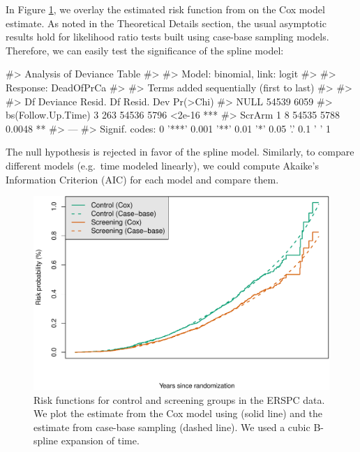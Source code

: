 In Figure \ref{fig:erspc-cox-cif}, we overlay the estimated risk
function from  on the Cox model estimate. As noted in the
Theoretical Details section, the usual asymptotic results hold for
likelihood ratio tests built using case-base sampling models. Therefore,
we can easily test the significance of the spline model:

\begin{Schunk}
\begin{Soutput}
#> Analysis of Deviance Table
#> 
#> Model: binomial, link: logit
#> 
#> Response: DeadOfPrCa
#> 
#> Terms added sequentially (first to last)
#> 
#> 
#>                    Df Deviance Resid. Df Resid. Dev Pr(>Chi)    
#> NULL                               54539       6059             
#> bs(Follow.Up.Time)  3      263     54536       5796   <2e-16 ***
#> ScrArm              1        8     54535       5788   0.0048 ** 
#> ---
#> Signif. codes:  0 '***' 0.001 '**' 0.01 '*' 0.05 '.' 0.1 ' ' 1
\end{Soutput}
\end{Schunk}

The null hypothesis is rejected in favor of the spline model. Similarly,
to compare different models (e.g.~time modeled linearly), we could
compute Akaike's Information Criterion (AIC) for each model and compare
them.

\begin{Schunk}
\begin{figure}[ht]
\includegraphics[width=\textwidth,keepaspectratio=true]{./erspc-cox-cif-1} \caption{Risk functions for control and screening groups in the ERSPC data. We plot the estimate from the Cox model using  (solid line) and the estimate from case-base sampling (dashed line). We used a cubic B-spline expansion of time.}\label{fig:erspc-cox-cif}
\end{figure}
\end{Schunk}

